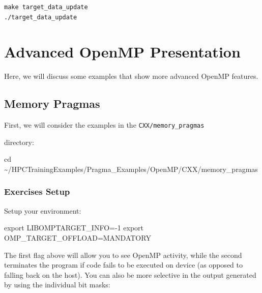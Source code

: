 \documentclass[
]{article}
\let\oldtexttt\texttt
\renewcommand{\texttt}[1]{
  \colorbox{Light}{\oldtexttt{#1}}
}
\newenvironment{Shaded}{}{}
\newcommand{\BuiltInTok}[1]{#1}
\newcommand{\NormalTok}[1]{#1}
\newcommand{\VariableTok}[1]{\textcolor[rgb]{0.10,0.09,0.49}{#1}}
\begin{document}
\begin{verbatim}
make target_data_update
./target_data_update
\end{verbatim}

\hypertarget{advanced-openmp-presentation}{%
\section{Advanced OpenMP
Presentation}\label{advanced-openmp-presentation}}

Here, we will discuss some examples that show more advanced OpenMP
features.

\hypertarget{memory-pragmas}{%
\subsection{Memory Pragmas}\label{memory-pragmas}}

First, we will consider the examples in the \texttt{CXX/memory\_pragmas}
directory:

\begin{Shaded}
\begin{Highlighting}[]
\BuiltInTok{cd}\NormalTok{ \textasciitilde{}/HPCTrainingExamples/Pragma\_Examples/OpenMP/CXX/memory\_pragmas}
\end{Highlighting}
\end{Shaded}

\hypertarget{exercises-setup}{%
\subsubsection{Exercises Setup}\label{exercises-setup}}

Setup your environment:

\begin{Shaded}
\begin{Highlighting}[]
\BuiltInTok{export} \VariableTok{LIBOMPTARGET\_INFO=}\NormalTok{{-}1}
\BuiltInTok{export} \VariableTok{OMP\_TARGET\_OFFLOAD=}\NormalTok{MANDATORY}
\end{Highlighting}
\end{Shaded}

The first flag above will allow you to see OpenMP activity, while the
second terminates the program if code fails to be executed on device (as
opposed to falling back on the host). You can also be more selective in
the output generated by using the individual bit masks:

\begin{Shaded}
\end{Shaded}
\end{document}
